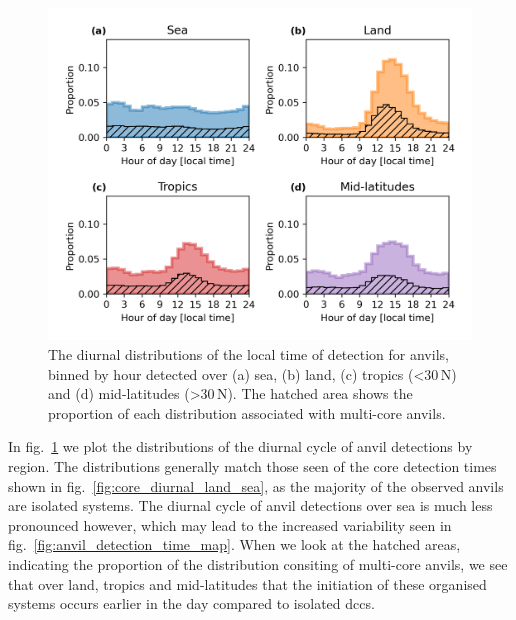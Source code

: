 \begin{figure}[tp]
    \centering
    \includegraphics[width=\textwidth]{figures/chapter2_24.png}
    \caption[
    The diurnal distributions of the local time of detection for anvils detected over sea, land, tropics and mid-latitudes
    ]{
    The diurnal distributions of the local time of detection for anvils, binned by hour detected over (a) sea, (b) land, (c) tropics (\textless 30\,\textdegree N) and (d) mid-latitudes (\textgreater 30\,\textdegree N). The hatched area shows the proportion of each distribution associated with multi-core anvils.
    }
    \label{fig:anvil_diurnal_distributions}
\end{figure}

In fig.~\ref{fig:anvil_diurnal_distributions} we plot the distributions of the diurnal cycle of anvil detections by region.
The distributions generally match those seen of the core detection times shown in fig.~\ref{fig:core_diurnal_land_sea}, as the majority of the observed anvils are isolated systems.
The diurnal cycle of anvil detections over sea is much less pronounced however, which may lead to the increased variability seen in fig.~\ref{fig:anvil_detection_time_map}.
When we look at the hatched areas, indicating the proportion of the distribution consiting of multi-core anvils, we see that over land, tropics and mid-latitudes that the initiation of these organised systems occurs earlier in the day compared to isolated \acrshort{dcc}s.

